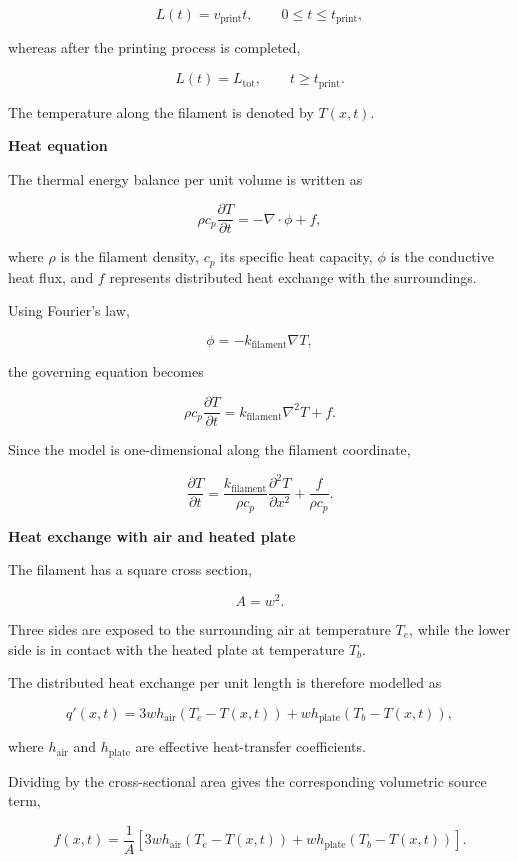 \documentclass[11pt,a4paper]{article}
\begin{document}
\[
L(t)=v_{\mathrm{print}}t,
\qquad 0\leq t\leq t_{\mathrm{print}},
\]

whereas after the printing process is completed,

\[
L(t)=L_{\mathrm{tot}},
\qquad t\geq t_{\mathrm{print}}.
\]

The temperature along the filament is denoted by $T(x,t)$.

\smallskip
\noindent\textbf{Heat equation}

The thermal energy balance per unit volume is written as

\[
\rho c_p\frac{\partial T}{\partial t}
=
-\nabla\cdot\phi + f,
\]

where $\rho$ is the filament density, $c_p$ its specific heat capacity,
$\phi$ is the conductive heat flux, and $f$ represents distributed heat exchange with the
surroundings.

Using Fourier's law,

\[
\phi=-k_{\mathrm{filament}}\nabla T,
\]

the governing equation becomes

\[
\rho c_p\frac{\partial T}{\partial t}
=
k_{\mathrm{filament}}\nabla^2T+f.
\]

Since the model is one-dimensional along the filament coordinate,

\[
\frac{\partial T}{\partial t}
=
\frac{k_{\mathrm{filament}}}{\rho c_p}
\frac{\partial^2T}{\partial x^2}
+
\frac{f}{\rho c_p}.
\]

\medskip
\noindent\textbf{Heat exchange with air and heated plate}

The filament has a square cross section,

\[
A=w^2.
\]

Three sides are exposed to the surrounding air at temperature $T_e$, while the lower side is in
contact with the heated plate at temperature $T_b$.

The distributed heat exchange per unit length is therefore modelled as

\[
q'(x,t)
=
3wh_{\mathrm{air}}\left(T_e-T(x,t)\right)
+
wh_{\mathrm{plate}}\left(T_b-T(x,t)\right),
\]

where $h_{\mathrm{air}}$ and $h_{\mathrm{plate}}$ are effective heat-transfer coefficients.

Dividing by the cross-sectional area gives the corresponding volumetric source term,

\[
f(x,t)
=
\frac{1}{A}
\left[
3wh_{\mathrm{air}}\left(T_e-T(x,t)\right)
+
wh_{\mathrm{plate}}\left(T_b-T(x,t)\right)
\right].
\]
\end{document}
